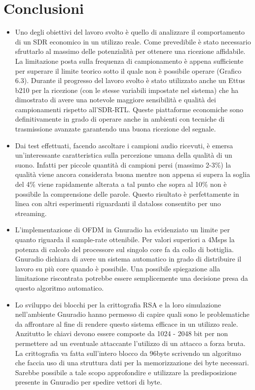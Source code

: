 \chapter{Conclusioni}
\label{cha:conclusioni}
\begin{itemize}
 \item Uno degli obiettivi del lavoro svolto è quello di analizzare il comportamento di un SDR economico in un utilizzo reale. Come prevedibile è stato necessario sfruttarlo al massimo delle potenzialità per ottenere una ricezione affidabile. La limitazione posta sulla frequenza di campionamento è appena sufficiente per superare il limite teorico sotto il quale non è possibile operare (Grafico 6.3). Durante il progresso del lavoro svolto è stato utilizzato anche un Ettus b210 per la ricezione (con le stesse variabili impostate nel sistema) che ha dimostrato di avere una notevole maggiore sensibilità e qualità dei campionamenti rispetto all'SDR-RTL. Queste piattaforme economiche sono definitivamente in grado di operare anche in ambienti con tecniche di trasmissione avanzate garantendo una buona ricezione del segnale.
 \item
 Dai test effettuati, facendo ascoltare i campioni audio ricevuti, è emersa un'interessante caratteristica sulla percezione umana della qualità di un suono. Infatti per piccole quantità di campioni persi (massimo 2-3\%) la qualità viene ancora considerata buona mentre non appena si supera la soglia del 4\%  viene rapidamente alterata a tal punto che sopra al 10\% non è possibile la comprensione delle parole.
 Questo risultato è perfettamente in linea con altri esperimenti riguardanti il dataloss consentito per uno streaming. \cite{dataloss}
 \item L'implementazione di OFDM in Gnuradio ha evidenziato un limite per quanto riguarda il sample-rate ottenibile. Per valori superiori a 4Msps la potenza di calcolo del processore sul singolo core fa da collo di bottiglia. Gnuradio dichiara di avere un sistema automatico in grado di distribuire il lavoro su più core quando è possibile. Una possibile spiegazione alla limitazione riscontrata potrebbe essere semplicemente una decisione presa da questo algoritmo automatico.
 \item Lo sviluppo dei blocchi per la crittografia RSA e la loro simulazione nell'ambiente Gnuradio hanno permesso di capire quali sono le problematiche da affrontare al fine di rendere questo sistema efficace in un utilizzo reale. Anzitutto le chiavi devono essere composte da 1024 - 2048 bit per non permettere ad un eventuale attaccante l'utilizzo di un attacco a forza bruta. La crittografia va fatta sull'intero blocco da 96byte scrivendo un algoritmo che faccia uso di una struttura dati per la memorizzazione dei byte necessari. \\Sarebbe possibile a tale scopo approfondire e utilizzare la predisposizione presente in Gnuradio per spedire vettori di byte.

\end{itemize}
